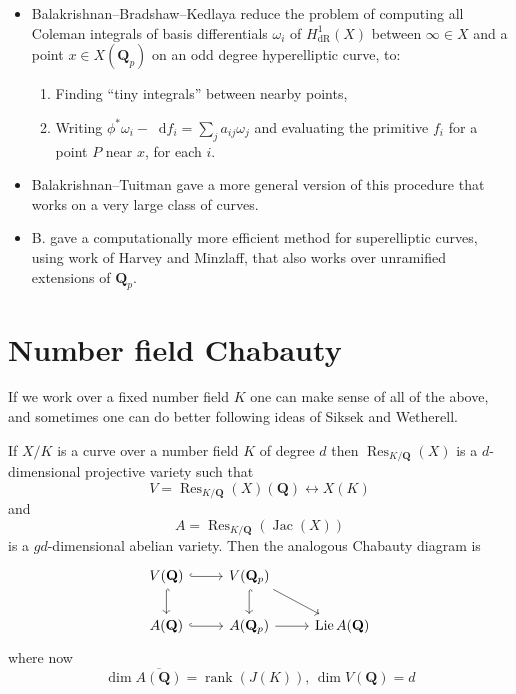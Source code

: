 \documentclass[oneside,11pt,]{article}
\DeclareMathOperator{\Jac}{Jac}
\DeclareMathOperator{\rank}{rank}
\DeclareMathOperator{\Res}{Res}
\newcommand{\diff}{\mathop{}\!\mathrm{d}}
\newcommand{\ZZ}{\mathbf{Z}}
\newcommand{\QQ}{\mathbf{Q}}
\begin{document}
    \begin{itemize}
        \item Balakrishnan--Bradshaw--Kedlaya reduce the problem of computing all Coleman integrals of basis differentials \(\omega_i\) of \(H^1_{\mathrm{dR}}(X)\) between \(\infty\in X\) and a point \(x\in X(\QQ_p)\) on an odd degree hyperelliptic curve, to:
    \begin{enumerate}
        \item Finding ``tiny integrals'' between nearby points,
        \item Writing \(\phi^*\omega_i  - \diff f_i=\sum_j a_{ij}\omega_j \) and evaluating the primitive \(f_i\) for a point \(P\) near \(x\), for each \(i\).
    \end{enumerate}
        \item Balakrishnan--Tuitman gave a more general version of this procedure that works on a very large class of curves.
        \item B. gave a computationally more efficient method for superelliptic curves, using work of Harvey and Minzlaff, that also works over unramified extensions of $\QQ_p$.
    \end{itemize}




\section{Number field Chabauty}
If we work over a fixed number field $K$ one can make sense of all of the above, and sometimes one can do better following ideas of Siksek and Wetherell.

If $X/K$ is a curve over a number field $K$ of degree $d$ then \(\Res_{K/\QQ} (X)\)
is a $d$-dimensional projective variety such that
\[V = \Res_{K/\QQ} (X)(\QQ) \leftrightarrow X(K)\]
and
\[A = \Res_{K/\QQ} (\Jac(X))\]
is a $gd$-dimensional abelian variety.
Then the analogous Chabauty diagram is
\[\begin{tikzcd}
	{V(\mathbf Q)} & {V(\mathbf Q_p)} \\
    {A(\mathbf Q)} & {A(\mathbf Q_p)} & {\operatorname{Lie} A (\mathbf Q)}
	\arrow[hook, from=1-1, to=1-2]
	\arrow[hook, from=1-1, to=2-1]
	\arrow[hook, from=1-2, to=2-2]
	\arrow[hook, from=2-1, to=2-2]
	\arrow[from=1-2, to=2-3]
	\arrow[from=2-2, to=2-3]
\end{tikzcd}\]
where now
\[\dim \overline{A(\QQ)} = \rank(J(K)),\,
\dim V(\QQ) = d\]
\end{document}
